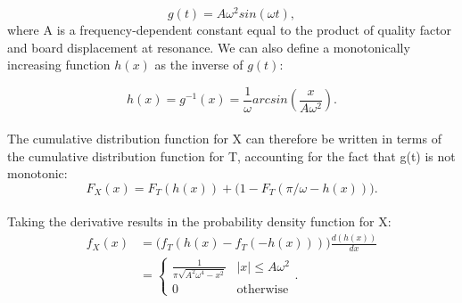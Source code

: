\documentclass[12pt]{article}
\begin{document}
\begin{appendix}
    \begin{equation}
      g(t) = A \omega^2 sin(\omega t),
    \end{equation}
    where A is a frequency-dependent constant equal to the product of quality factor and board displacement at resonance. We can also define a monotonically increasing function $h(x)$ as the inverse of $g(t)$:

    \begin{equation}
      h(x) = g^{-1}(x) = \frac{1}{\omega} arcsin \left(\frac{x}{A\omega^2}\right).
    \end{equation}
    \\
    The cumulative distribution function for X can therefore be written in terms of the cumulative distribution function for T, accounting for the fact that g(t) is not monotonic:
    \begin{equation}
      F_X(x) = F_T(h(x)) + \Big(1 - F_T(\pi/\omega - h(x))\Big).
    \end{equation}
    \\
    Taking the derivative results in the probability density function for X:
    \begin{align}
      f_X(x) & = \Big(f_T(h(x) - f_T(-h(x)))\Big) \frac{d(h(x))}{dx}\\
      & =
      \begin{cases}
        \frac{1}{\pi \sqrt{A^2 \omega^4 - x^2}} & |x| \leq A \omega^2\\
        0 & \text{otherwise}
      \end{cases}.
    \end{align}

\end{appendix}
\end{document}
